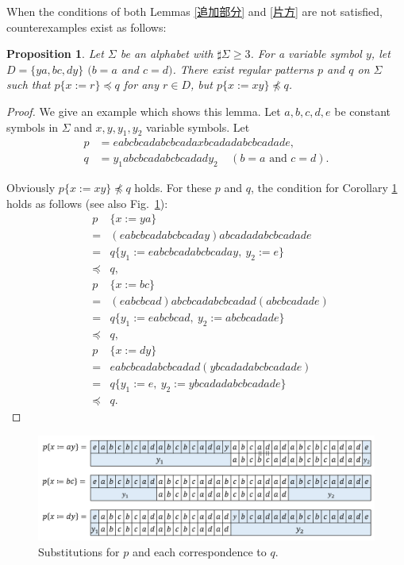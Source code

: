 When the conditions of both Lemmas \ref{追加部分} and \ref{片方} are not satisfied, counterexamples exist as follows:

\newtheorem{prop}{Proposition}

\begin{prop}\label{両方}
  Let $\Sigma$ be an alphabet with $\sharp \Sigma \ge 3$.
  For a variable symbol $y$, let $D= \{ ya, bc, dy \}$ $(b = a$ and $c = d)$. There exist regular patterns $p$ and $q$ on $\Sigma$ such that $p \{ x := r \} \preceq q$ for any $r \in D$, but $p \{ x := xy \} \not \preceq q$.
\end{prop}

\begin{proof}
We give an example which shows this lemma.
Let $a,b,c,d,e$ be constant symbols in $\Sigma$ and 
$x,y,y_{1},y_{2}$ variable symbols.
Let 
\begin{align*}
p &= eabcbcadabcbcadaxbcadadabcbcadade,\\
q &= y_{1}abcbcadabcbcadady_{2}~~~~~(b = a\mbox{~and~}c = d).
\end{align*}

\noindent
Obviously $p \{ x:=xy \} \not \preceq q$ holds.
For these $p$ and $q$, the condition for Corollary \ref{両方} holds as follows (see also Fig.~\ref{b=aとc=dの例}):
\begin{eqnarray*}
&p& \{ x:=ya \} \\ 
& = & (eabcbcadabcbcaday)abcadadabcbcadade\\
& = & q \{ y_{1} := eabcbcadabcbcaday,~y_{2}:=e \} \\
& \preceq & q,\\
&p& \{ x:=bc \}  \\
& = & (eabcbcad)abcbcadabcbcadad(abcbcadade) \\
& = & q \{ y_{1} := eabcbcad,~y_{2} := abcbcadade \} \\
& \preceq & q,\\
&p& \{ x:=dy \}  \\
& = & eabcbcadabcbcadad(ybcadadabcbcadade) \\
& = & q \{ y_{1}:=e,~y_{2} := ybcadadabcbcadade \} \\
& \preceq & q.
\end{eqnarray*}
\end{proof}

\begin{figure}[t]
\begin{center}
\includegraphics[scale=0.45]{figs/Exam_b=a_c=d.png}
\end{center}
\caption{Substitutions for $p$ and each correspondence to $q$.}
\label{b=aとc=dの例}
\end{figure}

